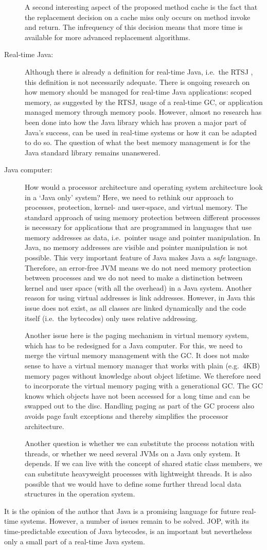 \begin{description}
A second interesting aspect of the proposed method cache is the fact
that the replacement decision on a cache miss only occurs on method
invoke and return. The infrequency of this decision means that more
time is available for more advanced replacement algorithms.


    \item[Real-time Java:]
Although there is already a definition for real-time Java, i.e.\ the
RTSJ \cite{rtsj}, this definition is not necessarily adequate. There
is ongoing research on how memory should be managed for real-time
Java applications: scoped memory, as suggested by the RTSJ, usage of
a real-time GC, or application managed memory through memory pools.
However, almost no research has been done into how the Java library
which has proven a major part of Java's success, can be used in
real-time systems or how it can be adapted to do so. The question of
what the best memory management is for the Java standard library
remains unanswered.

    \item[Java computer:]
How would a processor architecture and operating system architecture
look in a `Java only' system? Here, we need to rethink our approach
to processes, protection, kernel- and user-space, and virtual
memory. The standard approach of using memory protection between
different processes is necessary for applications that are
programmed in languages that use memory addresses as data, i.e.\
pointer usage and pointer manipulation. In Java, no memory addresses
are visible and pointer manipulation is not possible. This very
important feature of Java makes Java a \emph{safe} language.
Therefore, an error-free JVM means we do not need memory protection
between processes and we do not need to make a distinction between
kernel and user space (with all the overhead) in a Java system.
Another reason for using virtual addresses is link addresses.
However, in Java this issue does not exist, as all classes are
linked dynamically and the code itself (i.e.\ the bytecodes) only
uses relative addressing.

Another issue here is the paging mechanism in virtual memory system,
which has to be redesigned for a Java computer. For this, we need to
merge the virtual memory management with the GC. It does not make
sense to have a virtual memory manager that works with plain (e.g.\
4KB) memory pages without knowledge about object lifetime. We
therefore need to incorporate the virtual memory paging with a
generational GC. The GC knows which objects have not been accessed
for a long time and can be swapped out to the disc. Handling paging
as part of the GC process also avoids page fault exceptions and
thereby simplifies the processor architecture.

Another question is whether we can substitute the process notation
with threads, or whether we need several JVMs on a Java only system.
It depends. If we can live with the concept of shared static class
members, we can substitute heavyweight processes with lightweight
threads. It is also possible that we would have to define some
further thread local data structures in the operation system.

\end{description}
%
It is the opinion of the author that Java is a promising language
for future real-time systems. However, a number of issues remain to
be solved. JOP, with its time-predictable execution of Java
bytecodes, is an important but nevertheless only a small part of a
real-time Java system.
